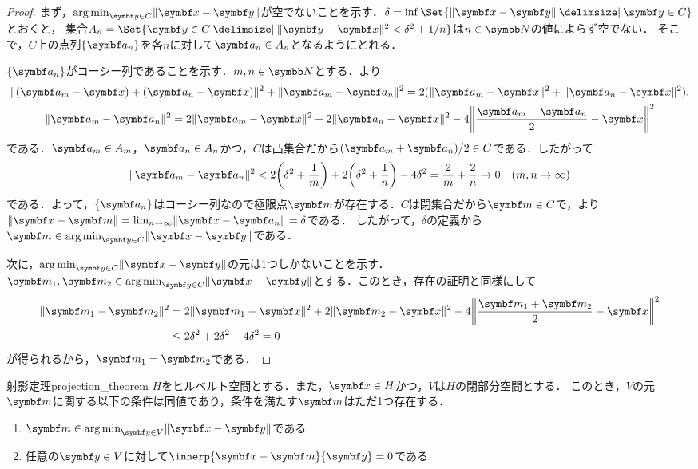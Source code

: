 \documentclass[../../main]{subfiles}
\begin{document}
\begin{proof}
  まず，\(\argmin_{\vect{y}\in C}\vnorm{\vect{x}-\vect{y}}\)が空でないことを示す．\(\delta=\inf\Set{\vnorm{\vect{x}-\vect{y}}\given\vect{y}\in C}\)とおくと，
  集合\(A_n=\Set{\vect{y}\in C\given\vnorm{\vect{y}-\vect{x}}^2<\delta^2+1/n}\)は\(n\in\numset{N}\)の値によらず空でない．
  そこで，\(C\)上の点列\(\seq{\vect{a}_n}\)を各\(n\)に対して\(\vect{a}_n\in A_n\)となるようにとれる．

  \(\seq{\vect{a}_n}\)がコーシー列であることを示す．\(m,n\in\numset{N}\)とする．より
  \begin{gather*}
    \vnorm{(\vect{a}_m-\vect{x})+(\vect{a}_n-\vect{x})}^2+\vnorm{\vect{a}_m-\vect{a}_n}^2 = 2(\vnorm{\vect{a}_m-\vect{x}}^2+\vnorm{\vect{a}_n-\vect{x}}^2), \\
    \vnorm{\vect{a}_m-\vect{a}_n}^2 = 2\vnorm{\vect{a}_m-\vect{x}}^2+2\vnorm{\vect{a}_n-\vect{x}}^2-4\vnorm*{\frac{\vect{a}_m+\vect{a}_n}{2}-\vect{x}}^2
  \end{gather*}
  である．\(\vect{a}_m\in A_m\)，\(\vect{a}_n\in A_n\)かつ，\(C\)は凸集合だから\((\vect{a}_m+\vect{a}_n)/2\in C\)である．したがって
  \[
    \vnorm{\vect{a}_m-\vect{a}_n}^2 < 2\pqty*{\delta^2+\frac{1}{m}}+2\pqty*{\delta^2+\frac{1}{n}}-4\delta^2
    = \frac{2}{m}+\frac{2}{n} \to 0\quad(m,n\to\infty)
  \]
  である．よって，\(\seq{\vect{a}_n}\)はコーシー列なので極限点\(\vect{m}\)が存在する．\(C\)は閉集合だから\(\vect{m}\in C\)で，より\(\vnorm{\vect{x}-\vect{m}}=\lim_{n\to\infty}\vnorm{\vect{x}-\vect{a}_n}=\delta\)である．
  したがって，\(\delta\)の定義から\(\vect{m}\in\argmin_{\vect{y}\in C}\vnorm{\vect{x}-\vect{y}}\)である．

  次に，\(\argmin_{\vect{y}\in C}\vnorm{\vect{x}-\vect{y}}\)の元は1つしかないことを示す．\(\vect{m}_1,\vect{m}_2\in\argmin_{\vect{y}\in C}\vnorm{\vect{x}-\vect{y}}\)とする．このとき，存在の証明と同様にして
  \begin{align*}
    \vnorm{\vect{m}_1-\vect{m}_2}^2 &= 2\vnorm{\vect{m}_1-\vect{x}}^2+2\vnorm{\vect{m}_2-\vect{x}}^2-4\vnorm*{\frac{\vect{m}_1+\vect{m}_2}{2}-\vect{x}}^2 \\
    &\leq 2\delta^2+2\delta^2-4\delta^2 = 0
  \end{align*}
  が得られるから，\(\vect{m}_1=\vect{m}_2\)である．
\end{proof}

\begin{theorem}{射影定理}{projection_theorem}
  \(H\)をヒルベルト空間とする．また，\(\vect{x}\in H\)かつ，\(V\)は\(H\)の閉部分空間とする．
  このとき，\(V\)の元\(\vect{m}\)に関する以下の条件は同値であり，条件を満たす\(\vect{m}\)はただ1つ存在する．
  \begin{enumerate}
    \item \(\vect{m}\in\argmin_{\vect{y}\in V}\vnorm{\vect{x}-\vect{y}}\)である
    \item 任意の\(\vect{y}\in V\)に対して\(\innerp{\vect{x}-\vect{m}}{\vect{y}}=0\)である
  \end{enumerate}
\end{theorem}
\end{document}
